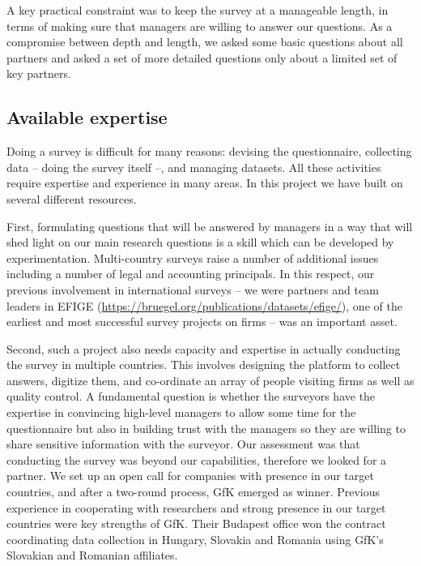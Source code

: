 \documentclass[final, dvipsnames, authoryear,12pt]{elsarticle}
\begin{document}
A key practical constraint was to keep the survey at a manageable length, in terms of making sure that managers are willing to answer our questions. As a compromise between depth and length, we asked some basic questions about all partners and asked a set of more detailed questions only about a limited set of key partners. 



\subsection{Available expertise}

Doing a survey is difficult for many reasons: devising the questionnaire, collecting data -- doing the survey itself --, and managing datasets. All these activities require expertise and experience in many areas. In this project we have built on several different resources.

First, formulating questions that will be answered by managers in a way that will shed light on our main research questions is a skill which can be developed by experimentation. Multi-country surveys raise a number of additional issues including a number of legal and accounting principals. In this respect, our previous involvement in international surveys -- we were partners and team leaders in EFIGE (\url{https://bruegel.org/publications/datasets/efige/}), one of the earliest and most successful survey projects on firms -- was an important asset. 

Second, such a project also needs capacity and expertise in actually conducting the survey in multiple countries. This involves designing the platform to collect answers, digitize them, and co-ordinate an array of people visiting firms as well as quality control. A fundamental question is whether the surveyors have the expertise in convincing high-level managers to allow some time for the questionnaire but also in building trust with the managers so they are willing to share sensitive information with the surveyor. Our assessment was that conducting the survey was beyond our capabilities, therefore we looked for a partner. We set up an open call for companies with presence in our target countries, and after a two-round process, GfK emerged as winner. Previous experience in cooperating with researchers and strong presence in our target countries were key strengths of GfK. Their Budapest office won the contract coordinating data collection in Hungary, Slovakia and Romania using GfK's Slovakian and Romanian affiliates. 
\end{document}

